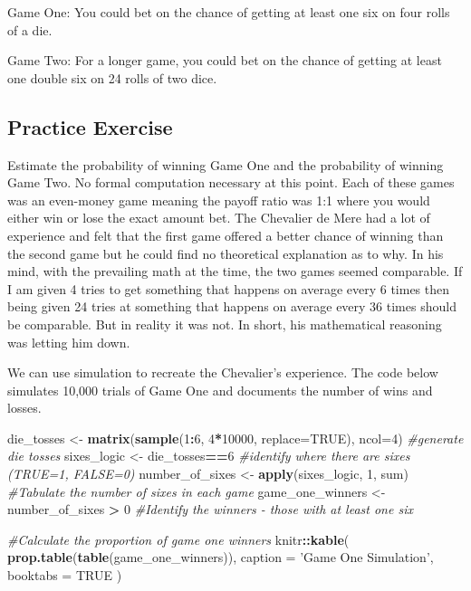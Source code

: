 \documentclass[]{book}
\newenvironment{Shaded}{\begin{snugshade}}{\end{snugshade}}
\newcommand{\KeywordTok}[1]{\textcolor[rgb]{0.13,0.29,0.53}{\textbf{#1}}}
\newcommand{\DataTypeTok}[1]{\textcolor[rgb]{0.13,0.29,0.53}{#1}}
\newcommand{\DecValTok}[1]{\textcolor[rgb]{0.00,0.00,0.81}{#1}}
\newcommand{\StringTok}[1]{\textcolor[rgb]{0.31,0.60,0.02}{#1}}
\newcommand{\CommentTok}[1]{\textcolor[rgb]{0.56,0.35,0.01}{\textit{#1}}}
\newcommand{\OtherTok}[1]{\textcolor[rgb]{0.56,0.35,0.01}{#1}}
\newcommand{\OperatorTok}[1]{\textcolor[rgb]{0.81,0.36,0.00}{\textbf{#1}}}
\newcommand{\NormalTok}[1]{#1}
\theoremstyle{definition}
\theoremstyle{definition}
\theoremstyle{definition}
\theoremstyle{remark}
\begin{document}
Game One: You could bet on the chance of getting at least one six on
four rolls of a die.

Game Two: For a longer game, you could bet on the chance of getting at
least one double six on 24 rolls of two dice.

\subsection{Practice Exercise}\label{practice-exercise-8}

Estimate the probability of winning Game One and the probability of
winning Game Two. No formal computation necessary at this point. Each of
these games was an even-money game meaning the payoff ratio was 1:1
where you would either win or lose the exact amount bet. The Chevalier
de Mere had a lot of experience and felt that the first game offered a
better chance of winning than the second game but he could find no
theoretical explanation as to why. In his mind, with the prevailing math
at the time, the two games seemed comparable. If I am given 4 tries to
get something that happens on average every 6 times then being given 24
tries at something that happens on average every 36 times should be
comparable. But in reality it was not. In short, his mathematical
reasoning was letting him down.

We can use simulation to recreate the Chevalier's experience. The code
below simulates 10,000 trials of Game One and documents the number of
wins and losses.

\begin{Shaded}
\begin{Highlighting}[]
\NormalTok{die_tosses <-}\StringTok{ }\KeywordTok{matrix}\NormalTok{(}\KeywordTok{sample}\NormalTok{(}\DecValTok{1}\OperatorTok{:}\DecValTok{6}\NormalTok{, }\DecValTok{4}\OperatorTok{*}\DecValTok{10000}\NormalTok{, }\DataTypeTok{replace=}\OtherTok{TRUE}\NormalTok{), }\DataTypeTok{ncol=}\DecValTok{4}\NormalTok{) }\CommentTok{#generate die tosses}
\NormalTok{sixes_logic <-}\StringTok{ }\NormalTok{die_tosses}\OperatorTok{==}\DecValTok{6} \CommentTok{#identify where there are sixes (TRUE=1, FALSE=0)}
\NormalTok{number_of_sixes <-}\StringTok{ }\KeywordTok{apply}\NormalTok{(sixes_logic, }\DecValTok{1}\NormalTok{, sum) }\CommentTok{#Tabulate the number of sixes in each game}
\NormalTok{game_one_winners <-}\StringTok{ }\NormalTok{number_of_sixes }\OperatorTok{>}\StringTok{ }\DecValTok{0} \CommentTok{#Identify the winners - those with at least one six}

 \CommentTok{#Calculate the proportion of game one winners}
\NormalTok{knitr}\OperatorTok{::}\KeywordTok{kable}\NormalTok{(}
  \KeywordTok{prop.table}\NormalTok{(}\KeywordTok{table}\NormalTok{(game_one_winners)), }\DataTypeTok{caption =} \StringTok{'Game One Simulation'}\NormalTok{,}
  \DataTypeTok{booktabs =} \OtherTok{TRUE}
\NormalTok{)}
\end{Highlighting}
\end{Shaded}
\end{document}
